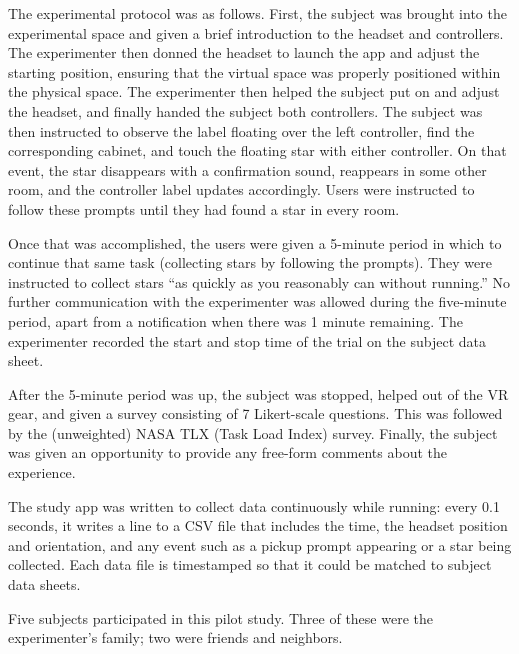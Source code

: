 \documentclass{sigchi}
\begin{document}
The experimental protocol was as follows.  First, the subject was brought into the experimental space and given a brief introduction to the headset and controllers.  The experimenter then donned the headset to launch the app and adjust the starting position, ensuring that the virtual space was properly positioned within the physical space.  The experimenter then helped the subject put on and adjust the headset, and finally handed the subject both controllers.  The subject was then instructed to observe the label floating over the left controller, find the corresponding cabinet, and touch the floating star with either controller.  On that event, the star disappears with a confirmation sound, reappears in some other room, and the controller label updates accordingly.  Users were instructed to follow these prompts until they had found a star in every room.

Once that was accomplished, the users were given a 5-minute period in which to continue that same task (collecting stars by following the prompts).  They were instructed to collect stars “as quickly as you reasonably can without running.”  No further communication with the experimenter was allowed during the five-minute period, apart from a notification when there was 1 minute remaining.  The experimenter recorded the start and stop time of the trial on the subject data sheet.

After the 5-minute period was up, the subject was stopped, helped out of the VR gear, and given a survey consisting of 7 Likert-scale questions.  This was followed by the (unweighted) NASA TLX (Task Load Index) survey.  Finally, the subject was given an opportunity to provide any free-form comments about the experience.

The study app was written to collect data continuously while running: every 0.1 seconds, it writes a line to a CSV file that includes the time, the headset position and orientation, and any event such as a pickup prompt appearing or a star being collected.  Each data file is timestamped so that it could be matched to subject data sheets.

Five subjects participated in this pilot study.  Three of these were the experimenter’s family; two were friends and neighbors.
\end{document}
